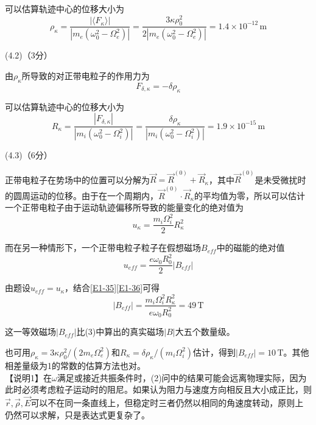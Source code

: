 \documentclass[10pt,a4paper,onecolumn,UTF8]{ctexart}
\begin{document}
	可以估算轨迹中心的位移大小为
	\begin{equation}\label{E1-32}
		\rho_{\kappa}=\frac{|\langle F_{\kappa}\rangle|}{|m_e(\omega_0^2-\Omega_e^2)|}=\frac{3\kappa\rho_0^2}{2|m_e(\omega_0^2-\Omega_e^2)|}=1.4\times10^{-12}\,\text{m}
	\end{equation}
	
	(4.2)（3分）
	
	由$\rho_{\kappa}$所导致的对正带电粒子的作用力为
	\begin{equation}\label{E1-33}
		F_{\delta,\kappa}=-\delta\rho_{\kappa}
	\end{equation}
	
	可以估算轨迹中心的位移大小为
	\begin{equation}\label{E1-34}
		R_{\kappa}=\frac{|F_{\delta,\kappa}|}{|m_i(\omega_0^2-\Omega_i^2)|}=\frac{\delta\rho_{\kappa}}{|m_i(\omega_0^2-\Omega_i^2)|}=1.9\times10^{-15}\,\text{m}
	\end{equation}
	
	(4.3)（6分）
	
	正带电粒子在势场中的位置可以分解为$\vec R=\vec R^{(0)}+\vec R_{\kappa}$，其中$\vec R^{(0)}$是未受微扰时的圆周运动的位移。由于在一个周期内，$\vec R^{(0)}\cdot\vec R_{\kappa}$的平均值为零，所以可以估计一个正带电粒子由于运动轨迹偏移所导致的能量变化的绝对值为
	\begin{equation}\label{E1-35}
		u_{\kappa}=\frac{m_i\Omega_i^2}{2}R_{\kappa}^2
	\end{equation}
	
	而在另一种情形下，一个正带电粒子粒子在假想磁场$B_{eff}$中的磁能的绝对值
	\begin{equation}\label{E1-36}
		u_{eff}=\frac{e\omega_0 R_0^2}{2} |B_{eff}|
	\end{equation}
	
	由题设$u_{eff}=u_{\kappa}$，结合\eqref{E1-35}\eqref{E1-36}可得
	\begin{equation}
		|B_{eff}|=\frac{m_i\Omega_i^2R_{\kappa}^2}{e\omega_0 R_0^2}=49\,\text{T}
	\end{equation}
	
	这一等效磁场$|B_{eff}|$比(3)中算出的真实磁场$|B|$大五个数量级。
	
		
	也可用$\rho_{\kappa}=3\kappa\rho_0^2/(2m_e\Omega_e^2)$和$R_{\kappa}=\delta\rho_{\kappa}/(m_i\Omega_i^2)$估计，得到$|B_{eff}|=10\,\text{T}$。其他相差量级为1的常数的估算方法也对。\\
	
	【说明1】在$\omega$满足或接近共振条件时，(2)问中的结果可能会远离物理实际，因为此时必须考虑粒子运动时的阻尼。如果认为阻力与速度方向相反且大小成正比，则$\vec r,\vec\rho,\vec E$可以不在同一条直线上，但稳定时三者仍然以相同的角速度转动，原则上仍然可以求解，只是表达式更复杂了。
	
\end{document}
